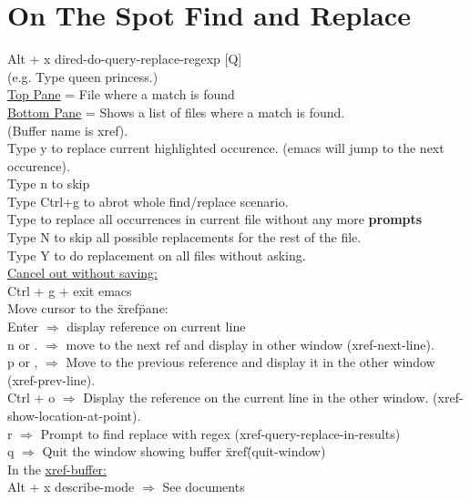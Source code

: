 \documentclass{article}
\begin{document}
\section{On The Spot Find and Replace}
Alt + x dired-do-query-replace-regexp [Q]
\\
(e.g. Type queen \Enter princess.)
\\
\underline{Top Pane} = File where a match is found
\\
\underline{Bottom Pane} = Shows a list of files where a match is found.
\\
(Buffer name is xref).
\\
Type y to replace current highlighted occurence. (emacs will jump to the next occurence).
\\
Type n to skip
\\
Type Ctrl+g to abrot whole find/replace scenario.
\\
Type \! to replace all occurrences in current file without any more \textbf{prompts}
\\
Type N to skip all possible replacements for the rest of the file.
\\
Type Y to do replacement on all files without asking.
\\
\underline{Cancel out without saving:}
\\
Ctrl + g + exit emacs
\\
Move cursor to the \"xref\" pane:
\\
Enter $\Rightarrow$ display reference on current line
\\
n or . $\Rightarrow$ move to the next ref and display in other window (xref-next-line).
\\
p or , $\Rightarrow$ Move to the previous reference and display it in the other window (xref-prev-line).
\\
Ctrl + o $\Rightarrow$ Display the reference on the current line in the other window. (xref-show-location-at-point).
\\
r $\Rightarrow$ Prompt to find replace with regex (xref-query-replace-in-results)
\\
q $\Rightarrow$ Quit the window showing buffer \"xref\" (quit-window)
\\
In the \underline{xref-buffer:}
\\
Alt + x describe-mode $\Rightarrow$ See documents
\\
\end{document}
